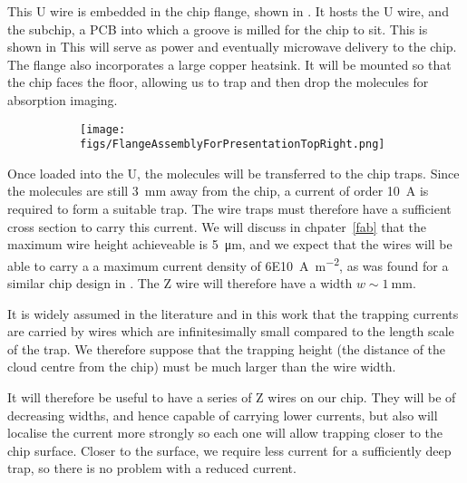 This U wire is embedded in the chip flange, shown in
. It hosts the U wire, and the subchip, a PCB
into which a groove is milled for the chip to sit. This is shown in
 This will serve as power and
eventually microwave delivery to the chip. The flange also incorporates a large
copper heatsink. It will be mounted so that the chip faces the floor, allowing
us to trap and then drop the molecules for absorption imaging.~\cite{}

\begin{figure}
  \centering
    \begin{subfigure}{.3\textwidth}
      \texttt{[image: figs/FlangeAssemblyForPresentationTopRight.png]}
      \caption{}
    \end{subfigure}
    \begin{subfigure}{.3\textwidth}
      \caption{}
    \end{subfigure}
    \begin{subfigure}{.3\textwidth}
      \caption{}
    \end{subfigure}
  \caption{}
  \label{design:fig:chipexperiment}
\end{figure}

Once loaded into the U, the molecules will be transferred to the chip traps.
Since the molecules are still \SI{3}{\milli\meter} away from the chip, a
current of order \SI{10}{\ampere} is required to form a suitable trap. The wire
traps must therefore have a sufficient cross section to carry this current.
We will discuss in chpater~\ref{fab} that the maximum wire height achieveable
is \SI{5}{\micro\meter}, and we expect that the wires will be able to carry a 
a maximum current density of \SI{6E10}{\ampere\per\meter\squared}, as was found
for a similar chip design in . The Z wire will
therefore have a width $w\sim\SI{1}{\milli\meter}$.

It is widely assumed in the literature and in this work that the trapping
currents are carried by wires which are infinitesimally small compared to the
length scale of the trap. We therefore suppose that the trapping height (the
distance of the cloud centre from the chip) must be much larger than the wire
width.

It will therefore be useful to have a series of Z wires on our chip. They will
be of decreasing widths, and hence capable of carrying lower currents, but also
will localise the current more strongly so each one will allow trapping closer
to the chip surface. Closer to the surface, we require less current for a
sufficiently deep trap, so there is no problem with a reduced current.

